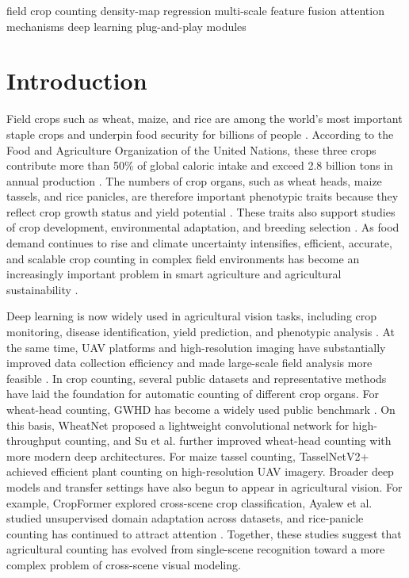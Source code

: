 \documentclass[a4paper,fleqn]{cas-sc}
\newcommand{\sep}{\quad}
\begin{document}
	\begin{keywords}
		field crop counting \sep density-map regression \sep multi-scale feature fusion \sep attention mechanisms \sep deep learning \sep plug-and-play modules
	\end{keywords}
	
	\maketitle
	
	\section{Introduction}
	\linenumbers
	
	Field crops such as wheat, maize, and rice are among the world's most important staple crops and underpin food security for billions of people \cite{ref1,ref2}. According to the Food and Agriculture Organization of the United Nations, these three crops contribute more than 50\% of global caloric intake and exceed 2.8 billion tons in annual production \cite{ref3}. The numbers of crop organs, such as wheat heads, maize tassels, and rice panicles, are therefore important phenotypic traits because they reflect crop growth status and yield potential \cite{ref4,ref5}. These traits also support studies of crop development, environmental adaptation, and breeding selection \cite{ref6,ref7}. As food demand continues to rise and climate uncertainty intensifies, efficient, accurate, and scalable crop counting in complex field environments has become an increasingly important problem in smart agriculture and agricultural sustainability \cite{ref8,ref9}.
	
	Deep learning is now widely used in agricultural vision tasks, including crop monitoring, disease identification, yield prediction, and phenotypic analysis \cite{ref8,ref14}. At the same time, UAV platforms and high-resolution imaging have substantially improved data collection efficiency and made large-scale field analysis more feasible \cite{ref19,ref50}. In crop counting, several public datasets and representative methods have laid the foundation for automatic counting of different crop organs. For wheat-head counting, GWHD has become a widely used public benchmark \cite{ref2,ref51}. On this basis, WheatNet \cite{ref52} proposed a lightweight convolutional network for high-throughput counting, and Su et al. \cite{ref53} further improved wheat-head counting with more modern deep architectures. For maize tassel counting, TasselNetV2+ \cite{ref43} achieved efficient plant counting on high-resolution UAV imagery. Broader deep models and transfer settings have also begun to appear in agricultural vision. For example, CropFormer \cite{ref54} explored cross-scene crop classification, Ayalew et al. \cite{ref55} studied unsupervised domain adaptation across datasets, and rice-panicle counting has continued to attract attention \cite{ref5,ref56}. Together, these studies suggest that agricultural counting has evolved from single-scene recognition toward a more complex problem of cross-scene visual modeling.
	
\end{document}
